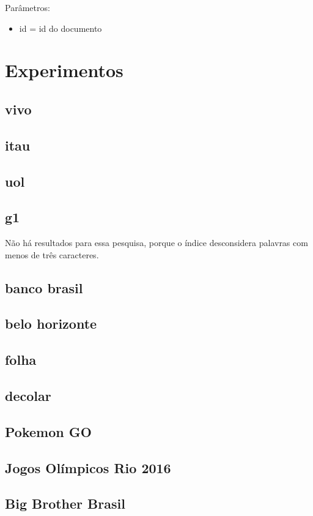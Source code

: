 \documentclass{article}
\begin{document}
Parâmetros: 
\begin{itemize}
  \item id = id do documento
\end{itemize}

\section{Experimentos}

\subsection{vivo}
\subsection{itau}
\subsection{uol}
\subsection{g1}

Não há resultados para essa pesquisa, porque o índice desconsidera
palavras com menos de três caracteres.

\subsection{banco brasil}
\subsection{belo horizonte}
\subsection{folha}
\subsection{decolar}
\subsection{Pokemon GO}
\subsection{Jogos Olímpicos Rio 2016}
\subsection{Big Brother Brasil}
\end{document}
